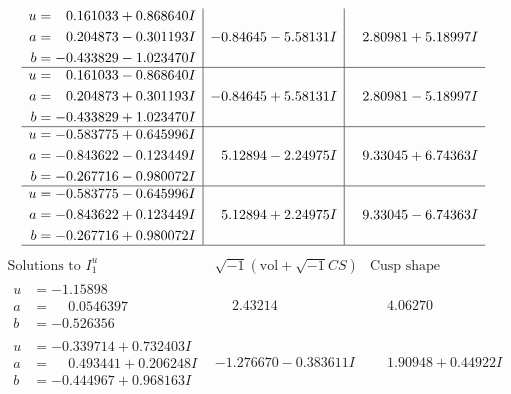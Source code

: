 \documentclass[1p]{elsarticle_modified}
\theoremstyle{definition}
\newcommand{\I}{\sqrt{-1}}
\begin{document}
$$\begin{array}{c|c|c}
\begin{aligned}
u &= \phantom{-}0.161033 + 0.868640 I \\
a &= \phantom{-}0.204873 - 0.301193 I \\
b &= -0.433829 - 1.023470 I\end{aligned}
 & -0.84645 - 5.58131 I & \phantom{-}2.80981 + 5.18997 I \\ \hline\begin{aligned}
u &= \phantom{-}0.161033 - 0.868640 I \\
a &= \phantom{-}0.204873 + 0.301193 I \\
b &= -0.433829 + 1.023470 I\end{aligned}
 & -0.84645 + 5.58131 I & \phantom{-}2.80981 - 5.18997 I \\ \hline\begin{aligned}
u &= -0.583775 + 0.645996 I \\
a &= -0.843622 - 0.123449 I \\
b &= -0.267716 - 0.980072 I\end{aligned}
 & \phantom{-}5.12894 - 2.24975 I & \phantom{-}9.33045 + 6.74363 I \\ \hline\begin{aligned}
u &= -0.583775 - 0.645996 I \\
a &= -0.843622 + 0.123449 I \\
b &= -0.267716 + 0.980072 I\end{aligned}
 & \phantom{-}5.12894 + 2.24975 I & \phantom{-}9.33045 - 6.74363 I\\
 \hline 
 \end{array}$$\newpage$$\begin{array}{c|c|c}  
\text{Solutions to }I^u_{1}& \I (\text{vol} + \sqrt{-1}CS) & \text{Cusp shape}\\
 \hline 
\begin{aligned}
u &= -1.15898\phantom{ +0.000000I} \\
a &= \phantom{-}0.0546397\phantom{ +0.000000I} \\
b &= -0.526356\phantom{ +0.000000I}\end{aligned}
 & \phantom{-}2.43214\phantom{ +0.000000I} & \phantom{-}4.06270\phantom{ +0.000000I} \\ \hline\begin{aligned}
u &= -0.339714 + 0.732403 I \\
a &= \phantom{-}0.493441 + 0.206248 I \\
b &= -0.444967 + 0.968163 I\end{aligned}
 & -1.276670 - 0.383611 I & \phantom{-}1.90948 + 0.44922 I \\ \hline\begin{aligned}

\end{aligned}
\end{array}$$
\end{document}
